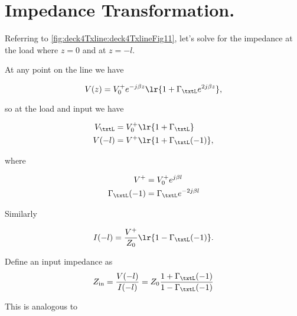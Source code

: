 \section{Impedance Transformation.}

Referring to \cref{fig:deck4Txline:deck4TxlineFig11}, let's solve for the impedance at the load where \( z = 0 \) and at \( z = -l \).


At any point on the line we have

\begin{dmath}\label{eqn:uwaves4TransmissionLinesCore:1320}
V(z) = V_0^{+} e^{-j \beta z} \lr{ 1 + \Gamma_\txtL e^{2 j \beta z} },
\end{dmath}

so at the load and input we have

\begin{equation}\label{eqn:uwaves4TransmissionLinesCore:1340}
\begin{aligned}
V_\txtL &= V_0^{+} \lr{ 1 + \Gamma_\txtL } \\
V(-l) &= V^{+} \lr{ 1 + \Gamma_\txtL(-1) },
\end{aligned}
\end{equation}

where

\begin{equation}\label{eqn:uwaves4TransmissionLinesCore:1360}
\begin{aligned}
V^{+} &= V_0^{+} e^{ j \beta l } \\
\Gamma_\txtL(-1) &= \Gamma_\txtL e^{-2 j \beta l}
\end{aligned}
\end{equation}

Similarly

\begin{equation}\label{eqn:uwaves4TransmissionLinesCore:1380}
I(-l) = \frac{V^{+}}{Z_0} \lr{ 1 - \Gamma_\txtL(-1) }.
\end{equation}

Define an input impedance as
\begin{dmath}\label{eqn:uwaves4TransmissionLinesCore:1400}
Z_{\textrm{in}}
= \frac{V(-l)}{I(-l)}
= Z_0 \frac{1 + \Gamma_\txtL(-1)}{1 - \Gamma_\txtL(-1)}
\end{dmath}

This is analogous to

